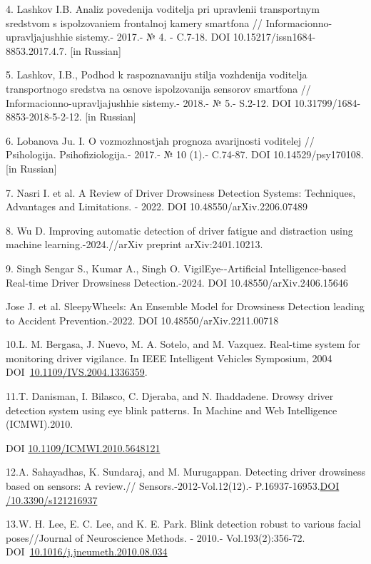 \documentclass[
]{article}
\begin{document}
4. Lashkov I.B. Analiz povedenija voditelja pri upravlenii transportnym
sredstvom s ispol\textquotesingle zovaniem frontal\textquotesingle noj
kamery smartfona // Informacionno-upravljajushhie sistemy.- 2017.- № 4.
- C.7-18. DOI 10.15217/issn1684-8853.2017.4.7. {[}in Russian{]}

5. Lashkov, I.B., Podhod k raspoznavaniju stilja vozhdenija voditelja
transportnogo sredstva na osnove ispol\textquotesingle zovanija sensorov
smartfona // Informacionno-upravljajushhie sistemy.- 2018.- № 5.-
S.2-12. DOI 10.31799/1684-8853-2018-5-2-12. {[}in Russian{]}

6. Lobanova Ju. I. O vozmozhnostjah prognoza avarijnosti voditelej //
Psihologija. Psihofiziologija.- 2017.- № 10 (1).- C.74-87. DOI
10.14529/psy170108. {[}in Russian{]}

7. Nasri I. et al. A Review of Driver Drowsiness Detection Systems:
Techniques, Advantages and Limitations. - 2022. DOI
10.48550/arXiv.2206.07489

8. Wu D. Improving automatic detection of driver fatigue and distraction
using machine learning.-2024.//arXiv preprint arXiv:2401.10213.

9. Singh Sengar S., Kumar A., Singh O. VigilEye-\/-Artificial
Intelligence-based Real-time Driver Drowsiness Detection.-2024. DOI
10.48550/arXiv.2406.15646

Jose J. et al. SleepyWheels: An Ensemble Model for Drowsiness Detection
leading to Accident Prevention.-2022. DOI 10.48550/arXiv.2211.00718

10.L. M. Bergasa, J. Nuevo, M. A. Sotelo, and M. Vazquez. Real-time
system for monitoring driver vigilance. In IEEE Intelligent Vehicles
Symposium, 2004
DOI~\href{https://doi.org/10.1109/IVS.2004.1336359}{10.1109/IVS.2004.1336359}.

11.T. Danisman, I. Bilasco, C. Djeraba, and N. Ihaddadene. Drowsy driver
detection system using eye blink patterns. In Machine and Web
Intelligence (ICMWI).2010.

DOI
\href{http://dx.doi.org/10.1109/ICMWI.2010.5648121}{10.1109/ICMWI.2010.5648121}

12.A. Sahayadhas, K. Sundaraj, and M. Murugappan. Detecting driver
drowsiness based on sensors: A review.// Sensors.-2012-Vol.12(12).-
P.16937-16953.\href{https://doi.org/10.3390/s121216937}{DOI
/10.3390/s121216937}

13.W. H. Lee, E. C. Lee, and K. E. Park. Blink detection robust to
various facial poses//Journal of Neuroscience Methods. - 2010.-
Vol.193(2):356-72.
DOI~\href{https://doi.org/10.1016/j.jneumeth.2010.08.034}{10.1016/j.jneumeth.2010.08.034}
\end{document}
